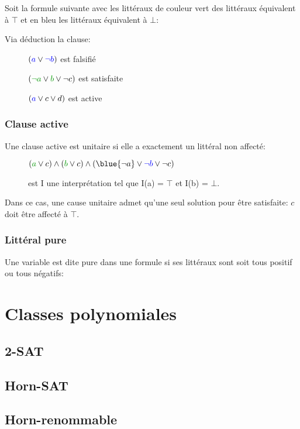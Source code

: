 Soit la formule suivante avec les littéraux de couleur vert des littéraux équivalent à $\top$ et en bleu les littéraux équivalent à $\bot$:\\

Via déduction la clause:
\begin{description}
\item[] $(\textcolor{blue}{a} \vee \textcolor{blue}{\neg b})$ est falsifié
\item[] $(\cvert{\neg a} \vee \cvert{b} \vee \neg c)$ est satisfaite
\item[] $(\textcolor{blue}{a} \vee c \vee d)$ est active
\end{description}

\pagebreak
\subsection{Clause active}
Une clause active est unitaire si elle a exactement un littéral non affecté:
\begin{description}
\item[] $(\cvert{a} \vee c) \wedge (\cvert{b} \vee c) \wedge (\blue{\neg a} \vee \cblue{\neg b} \vee \neg c)$
\item[] est I une interprétation tel que I(a) = $\top$ et I(b) = $\bot$.
\end{description}
Dans ce cas, une cause unitaire admet qu'une seul solution pour être satisfaite:
$c$ doit être affecté à $\top$.\\

\subsection{Littéral pure}
Une variable est dite pure dans une formule si ses littéraux sont soit tous positif ou tous négatifs:\\
\pagebreak
\chapter{Classes polynomiales}
\pagebreak
\section{2-SAT}
\section{Horn-SAT}
\section{Horn-renommable}

\pagebreak